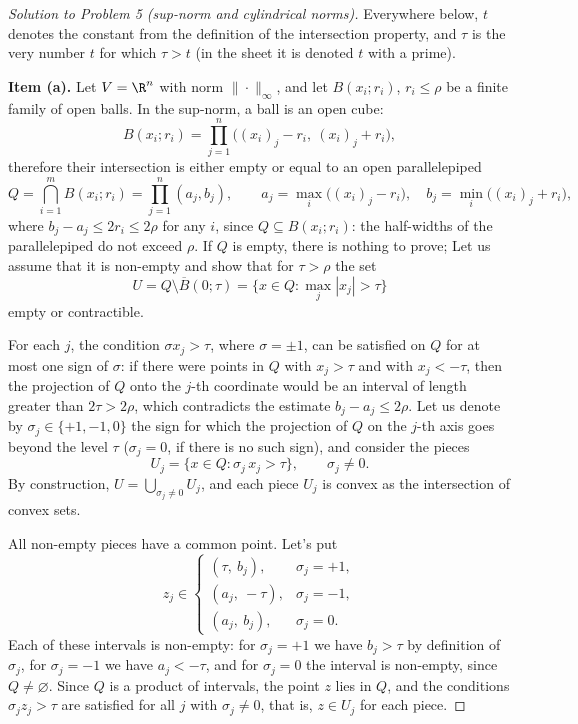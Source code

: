 \documentclass[a4paper,12pt]{report}
\begin{document}
\begin{proof}[Solution to Problem \textup{5} \textup{(}sup-norm and cylindrical norms\textup{)}]

Everywhere below, $t$ denotes the constant from the definition of the intersection property, and $\tau$ is the very number $t$ for which $\tau > t$ \textup{(}in the sheet it is denoted $t$ with a prime\textup{)}.

\textbf{Item \textup{(a)}.} Let $V = \R^n$ with norm $\|\cdot\|_\infty$, and let $B(x_i; r_i)$, $r_i \le \rho$ be a finite family of open balls. In the sup-norm, a ball is an open cube:
\[
B(x_i; r_i) = \prod_{j=1}^n \bigl((x_i)_j - r_i,\ (x_i)_j + r_i\bigr),
\]
therefore their intersection is either empty or equal to an open parallelepiped
\[
Q = \bigcap_{i=1}^m B(x_i; r_i) = \prod_{j=1}^n (a_j, b_j), \qquad
a_j = \max_i \bigl((x_i)_j - r_i\bigr), \quad b_j = \min_i \bigl((x_i)_j + r_i\bigr),
\]
where $b_j - a_j \le 2 r_i \le 2\rho$ for any $i$, since $Q \subseteq B(x_i; r_i)$: the half-widths of the parallelepiped do not exceed $\rho$. If $Q$ is empty, there is nothing to prove; Let us assume that it is non-empty and show that for $\tau > \rho$ the set
\[
U = Q \setminus \overline{B}(0; \tau) = \bigl\{x \in Q : \max_j |x_j| > \tau\bigr\}
\]
empty or contractible.

For each $j$, the condition $\sigma x_j > \tau$, where $\sigma = \pm 1$, can be satisfied on $Q$ for at most one sign of $\sigma$: if there were points in $Q$ with $x_j > \tau$ and with $x_j < -\tau$, then the projection of $Q$ onto the $j$-th coordinate would be an interval of length greater than $2\tau > 2\rho$, which contradicts the estimate $b_j - a_j \le 2\rho$. Let us denote by $\sigma_j \in \{+1, -1, 0\}$ the sign for which the projection of $Q$ on the $j$-th axis goes beyond the level $\tau$ \textup{(}$\sigma_j = 0$, if there is no such sign\textup{)}, and consider the pieces
\[
U_j = \bigl\{x \in Q : \sigma_j\, x_j > \tau\bigr\}, \qquad \sigma_j \ne 0.
\]
By construction, $U = \bigcup_{\sigma_j \ne 0} U_j$, and each piece $U_j$ is convex as the intersection of convex sets.

All non-empty pieces have a common point. Let's put
\[
z_j \in \begin{cases} (\tau,\ b_j), & \sigma_j = +1, \\ (a_j,\ -\tau), & \sigma_j = -1, \\ (a_j,\ b_j), & \sigma_j = 0. \end{cases}
\]
Each of these intervals is non-empty: for $\sigma_j = +1$ we have $b_j > \tau$ by definition of $\sigma_j$, for $\sigma_j = -1$ we have $a_j < -\tau$, and for $\sigma_j = 0$ the interval is non-empty, since $Q \ne \varnothing$. Since $Q$ is a product of intervals, the point $z$ lies in $Q$, and the conditions $\sigma_j z_j > \tau$ are satisfied for all $j$ with $\sigma_j \ne 0$, that is, $z \in U_j$ for each piece.


\end{proof}
\end{document}
